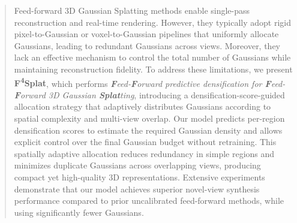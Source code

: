 \begin{abstract} 
Feed-forward 3D Gaussian Splatting methods enable single-pass reconstruction and real-time rendering. However, they typically adopt rigid pixel-to-Gaussian or voxel-to-Gaussian pipelines that uniformly allocate Gaussians, leading to redundant Gaussians across views. Moreover, they lack an effective mechanism to control the total number of Gaussians while maintaining reconstruction fidelity.
To address these limitations, we present \textbf{F\textsuperscript{4}Splat}, which performs \emph{\textbf{F}eed-\textbf{F}orward predictive densification for \textbf{F}eed-\textbf{F}orward 3D Gaussian \textbf{Splat}ting}, introducing a densification-score-guided allocation strategy that adaptively distributes Gaussians according to spatial complexity and multi-view overlap. Our model predicts per-region densification scores to estimate the required Gaussian density and allows explicit control over the final Gaussian budget without retraining. This spatially adaptive allocation reduces redundancy in simple regions and minimizes duplicate Gaussians across overlapping views, producing compact yet high-quality 3D representations.
Extensive experiments demonstrate that our model achieves superior novel-view synthesis performance compared to prior uncalibrated feed-forward methods, while using significantly fewer Gaussians. 
\end{abstract}